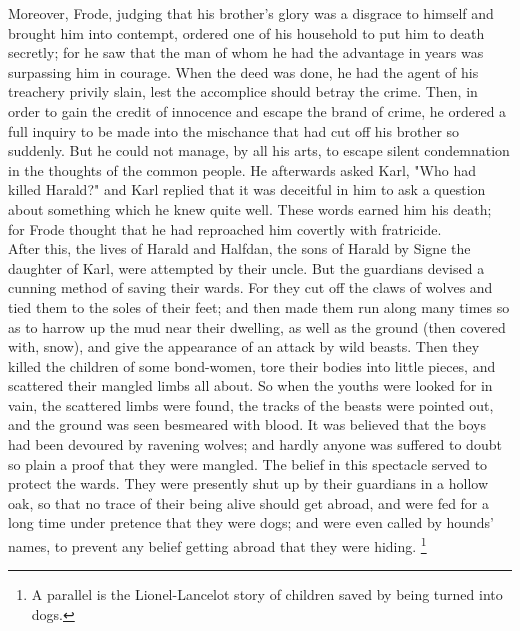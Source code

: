 \documentclass[10pt,a4paper]{report}
\begin{document}
Moreover, Frode, judging that his brother's glory was a disgrace to himself and brought him into contempt, ordered one of his household to put him to death secretly; for he saw that the man of whom he had the advantage in years was surpassing him in courage. When the deed was done, he had the agent of his treachery privily slain, lest the accomplice should betray the crime. Then, in order to gain the credit of innocence and escape the brand of crime, he ordered a full inquiry to be made into the mischance that had cut off his brother so suddenly. But he could not manage, by all his arts, to escape silent condemnation in the thoughts of the common people. He afterwards asked Karl, "Who had killed Harald?" and Karl replied that it was deceitful in him to ask a question about something which he knew quite well. These words earned him his death; for Frode thought that he had reproached him covertly with fratricide.\\

After this, the lives of Harald and Halfdan, the sons of Harald by Signe the daughter of Karl, were attempted by their uncle. But the guardians devised a cunning method of saving their wards. For they cut off the claws of wolves and tied them to the soles of their feet; and then made them run along many times so as to harrow up the mud near their dwelling, as well as the ground (then covered with, snow), and give the appearance of an attack by wild beasts. Then they killed the children of some bond-women, tore their bodies into little pieces, and scattered their mangled limbs all about. So when the youths were looked for in vain, the scattered limbs were found, the tracks of the beasts were pointed out, and the ground was seen besmeared with blood. It was believed that the boys had been devoured by ravening wolves; and hardly anyone was suffered to doubt so plain a proof that they were mangled. The belief in this spectacle served to protect the wards. They were presently shut up by their guardians in a hollow oak, so that no trace of their being alive should get abroad, and were fed for a long time under pretence that they were dogs; and were even called by hounds' names, to prevent any belief getting abroad that they were hiding. \footnote{A parallel is the Lionel-Lancelot story of children saved by being turned into dogs.}\\
\end{document}
